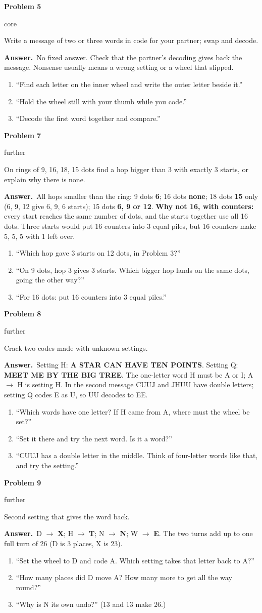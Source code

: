 \documentclass[11pt]{article}
\newcommand{\lbl}[1]{\colorbox{black!10}{\footnotesize\strut #1}}
\newcommand{\core}{\lbl{core}}
\newcommand{\further}{\lbl{further}}
\newcommand{\pb}[3]{\par\needspace{4\baselineskip}\vspace{3pt}\noindent\textbf{Problem #1}\enspace #2\enspace #3\par}
\newcommand{\ans}{\textbf{Answer.}\ }
\newenvironment{hints}{\begin{enumerate}[label={\textit{Hint \arabic*.}}, leftmargin=*, align=left]}{\end{enumerate}}
\begin{document}
\pb{5}{\core}{Write a message of two or three words in code for your partner; swap and decode.}
\ans No fixed answer. Check that the partner's decoding gives back the message. Nonsense usually means a wrong
setting or a wheel that slipped.
\begin{hints}
\item ``Find each letter on the inner wheel and write the outer letter beside it.''
\item ``Hold the wheel still with your thumb while you code.''
\item ``Decode the first word together and compare.''
\end{hints}

\pb{7}{\further}{On rings of 9, 16, 18, 15 dots find a hop bigger than 3 with exactly 3 starts, or explain why
there is none.}
\ans All hops smaller than the ring: 9 dots \textbf{6}; 16 dots \textbf{none}; 18 dots \textbf{15} only (6, 9, 12
give 6, 9, 6 starts); 15 dots \textbf{6, 9 or 12}.
\textbf{Why not 16, with counters:} every start reaches the same number of dots, and the starts together use all
16 dots. Three starts would put 16 counters into 3 equal piles, but 16 counters make 5, 5, 5 with 1 left over.
\begin{hints}
\item ``Which hop gave 3 starts on 12 dots, in Problem 3?''
\item ``On 9 dots, hop 3 gives 3 starts. Which bigger hop lands on the same dots, going the other way?''
\item ``For 16 dots: put 16 counters into 3 equal piles.''
\end{hints}

\pb{8}{\further}{Crack two codes made with unknown settings.}
\ans Setting H: \textbf{A STAR CAN HAVE TEN POINTS}. Setting Q: \textbf{MEET ME BY THE BIG TREE}. The one-letter
word H must be A or I; A $\to$ H is setting H. In the second message CUUJ and JHUU have double letters; setting
Q codes E as U, so UU decodes to EE.
\begin{hints}
\item ``Which words have one letter? If H came from A, where must the wheel be set?''
\item ``Set it there and try the next word. Is it a word?''
\item ``CUUJ has a double letter in the middle. Think of four-letter words like that, and try the setting.''
\end{hints}

\pb{9}{\further}{Second setting that gives the word back.}
\ans D $\to$ \textbf{X}; H $\to$ \textbf{T}; N $\to$ \textbf{N}; W $\to$ \textbf{E}. The two turns add up to one
full turn of 26 (D is 3 places, X is 23).
\begin{hints}
\item ``Set the wheel to D and code A. Which setting takes that letter back to A?''
\item ``How many places did D move A? How many more to get all the way round?''
\item ``Why is N its own undo?'' (13 and 13 make 26.)
\end{hints}
\end{document}
